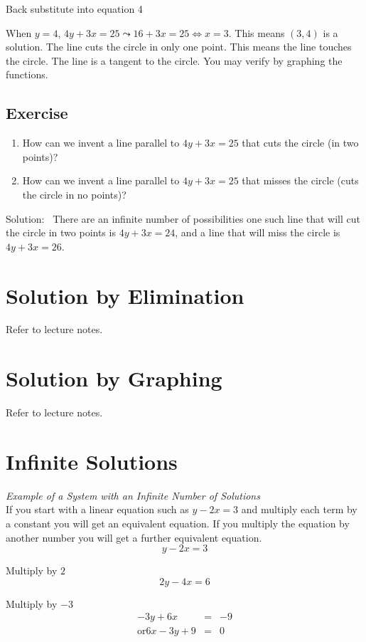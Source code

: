 Back substitute into equation 4 

When $y =4$, $4 y +3 x =25 \leadsto 16 +3 x =25 \Longleftrightarrow x =3$. This means $\left (3 ,4\right )$ is a solution. The
line cuts the circle in only one point. This means the line touches the circle. The
line is a tangent to the circle. You may verify by graphing the functions.

\subsection{Exercise}
\begin{enumerate}
	\item How can we invent a line parallel to $4 y +3 x =25$ that cuts the circle (in two points)? 
	
	\item How can we invent a line parallel
	to $4 y +3 x =25$ that misses the circle (cuts the circle in no points)? \end{enumerate}


Solution:
\ There are an infinite number of possibilities one such line that will cut the circle in two points is $4 y +3 x =24$, and a line that will miss the circle is $4 y +3 x =26$. 

\section{Solution by Elimination}
Refer to lecture notes.
\section{Solution by Graphing}
Refer to lecture notes.
\section{Infinite Solutions}
\emph{Example of a System with an Infinite Number of Solutions}\\
If you start with a linear equation such as $y -2 x =3$ and multiply each term by a constant you will get an equivalent equation. If you multiply the equation by another number you
will get a further equivalent equation.
\begin{equation*}y -2 x =3
\end{equation*}

Multiply by $2$
\begin{equation*}2 y -4 x =6
\end{equation*}

Multiply by $ -3$
\begin{align*} -3 y +6 x &  = &  -9 \\
\text{or}6 x -3 y +9 &  = & 0\end{align*}

